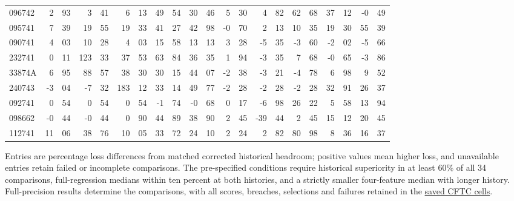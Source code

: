 \documentclass[11pt,a4paper]{article}
\begin{document}
\begin{table}[p]
{\begin{tabular}{l*{10}{r@{.}l}}
096742 & 2 & 93 & 3 & 41 & 6 & 13 & 49 & 54 & 30 & 46 & 5 & 30 & 4 & 82 & 62 & 68 & 37 & 12 & -0 & 49 \\
095741 & 7 & 39 & 19 & 55 & 19 & 33 & 41 & 27 & 42 & 98 & -0 & 70 & 2 & 13 & 10 & 35 & 19 & 30 & 55 & 39 \\
090741 & 4 & 03 & 10 & 28 & 4 & 03 & 15 & 58 & 13 & 13 & 3 & 28 & -5 & 35 & -3 & 60 & -2 & 02 & -5 & 66 \\
232741 & 0 & 11 & 123 & 33 & 37 & 53 & 63 & 84 & 36 & 35 & 1 & 94 & -3 & 35 & 7 & 68 & -0 & 65 & -3 & 86 \\
33874A & 6 & 95 & 88 & 57 & 38 & 30 & 30 & 15 & 44 & 07 & -2 & 38 & -3 & 21 & -4 & 78 & 6 & 98 & 9 & 52 \\
240743 & -3 & 04 & -7 & 32 & 183 & 12 & 33 & 14 & 49 & 77 & -2 & 28 & -2 & 28 & -2 & 28 & 32 & 91 & 26 & 37 \\
092741 & 0 & 54 & 0 & 54 & 0 & 54 & -1 & 74 & -0 & 68 & 0 & 17 & -6 & 98 & 26 & 22 & 5 & 58 & 13 & 94 \\
098662 & -0 & 44 & -0 & 44 & 0 & 90 & 44 & 89 & 38 & 90 & 2 & 45 & -39 & 44 & 2 & 45 & 15 & 12 & 20 & 45 \\
112741 & 11 & 06 & 38 & 76 & 10 & 05 & 33 & 72 & 24 & 10 & 2 & 24 & 2 & 82 & 80 & 98 & 8 & 36 & 16 & 37 \\
\bottomrule\end{tabular}}
\par\vspace{2pt}\begin{minipage}{.98\linewidth}\footnotesize
Entries are percentage loss differences from matched corrected historical headroom; positive values mean higher loss, and unavailable entries retain failed or incomplete comparisons.
The pre-specified conditions require historical superiority in at least 60\% of all 34 comparisons, full-regression medians within ten percent at both histories, and a strictly smaller four-feature median with longer history.
Full-precision results determine the comparisons, with all scores, breaches, selections and failures retained in the \href{https://github.com/ByronLi0207/financial-mathematics-paper-20261020/blob/submission-final/results/v10/cftc/cells.csv}{saved CFTC cells}.
\end{minipage}\end{table}

\clearpage
\end{document}
